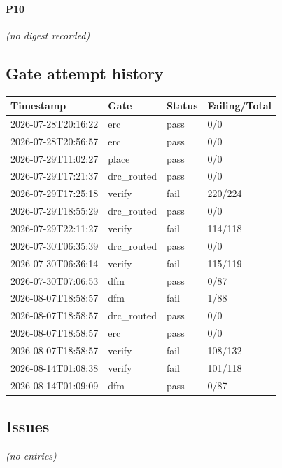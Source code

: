 \documentclass[11pt,a4paper]{article}
\begin{document}
\paragraph*{P10}
\emph{(no digest recorded)}
\subsection*{Gate attempt history}
{\small
\begin{longtable}{llll}
\toprule
\textbf{Timestamp} & \textbf{Gate} & \textbf{Status} & \textbf{Failing/Total} \\
\midrule
\endhead
2026-07-28T20:16:22 & erc & pass & 0/0 \\
2026-07-28T20:56:57 & erc & pass & 0/0 \\
2026-07-29T11:02:27 & place & pass & 0/0 \\
2026-07-29T17:21:37 & drc\_routed & pass & 0/0 \\
2026-07-29T17:25:18 & verify & fail & 220/224 \\
2026-07-29T18:55:29 & drc\_routed & pass & 0/0 \\
2026-07-29T22:11:27 & verify & fail & 114/118 \\
2026-07-30T06:35:39 & drc\_routed & pass & 0/0 \\
2026-07-30T06:36:14 & verify & fail & 115/119 \\
2026-07-30T07:06:53 & dfm & pass & 0/87 \\
2026-08-07T18:58:57 & dfm & fail & 1/88 \\
2026-08-07T18:58:57 & drc\_routed & pass & 0/0 \\
2026-08-07T18:58:57 & erc & pass & 0/0 \\
2026-08-07T18:58:57 & verify & fail & 108/132 \\
2026-08-14T01:08:38 & verify & fail & 101/118 \\
2026-08-14T01:09:09 & dfm & pass & 0/87 \\
\bottomrule
\end{longtable}
}
\subsection*{Issues}
\emph{(no entries)}
\end{document}
